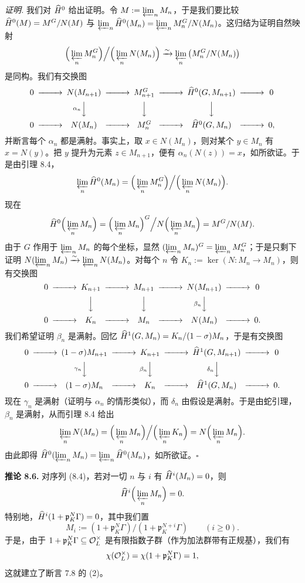 \textit{证明.} 我们对 $\widehat{H}^0$ 给出证明。令 $M:=\varprojlim_n M_n$，于是我们要比较 $\widehat{H}^0(M)=M^G/N(M)$ 与 $\varprojlim_n\widehat{H}^0(M_n)=\varprojlim_n M_n^G/N(M_n)$。这归结为证明自然映射
\[
\Big(\varprojlim_n M_n^G\Big)\Big/\Big(\varprojlim_n N(M_n)\Big)\xrightarrow{\sim}\varprojlim_n\big(M_n^G/N(M_n)\big)
\]
是同构。我们有交换图
\[
\begin{CD}
0 @>>> N(M_{n+1}) @>>> M_{n+1}^G @>>> \HH^0(G,M_{n+1}) @>>> 0\\
@. @V{\alpha_n}VV @VVV @VVV @.\\
0 @>>> N(M_{n}) @>>> M_{n}^G @>>> \HH^0(G,M_{n}) @>>> 0,
\end{CD}
\]
并断言每个 $\alpha_n$ 都是满射。事实上，取 $x\in N(M_n)$，则对某个 $y\in M_n$ 有 $x=N(y)$。把 $y$ 提升为元素 $z\in M_{n+1}$，便有 $\alpha_n(N(z))=x$，如所欲证。于是由引理 8.4，
\[
\varprojlim_n\widehat{H}^0(M_n)=\Big(\varprojlim_n M_n^G\Big)\Big/\Big(\varprojlim_n N(M_n)\Big).
\]
现在
\[
\widehat{H}^0\Big(\varprojlim_n M_n\Big)=\Big(\varprojlim_n M_n\Big)^G\Big/N\Big(\varprojlim_n M_n\Big)=M^G/N(M).
\]
由于 $G$ 作用于 $\varprojlim_n M_n$ 的每个坐标，显然 $(\varprojlim_n M_n)^G=\varprojlim_n M_n^G$；于是只剩下证明 $N(\varprojlim_n M_n)\xrightarrow{\sim}\varprojlim_n N(M_n)$。对每个 $n$ 令 $K_n:=\ker(N:M_n\to M_n)$，则有交换图
\[
\begin{CD}
0 @>>> K_{n+1} @>>> M_{n+1} @>>> N(M_{n+1}) @>>> 0\\
@. @VVV @VVV @V{\beta_n}VV @.\\
0 @>>> K_{n} @>>> M_{n} @>>> N(M_{n}) @>>> 0.
\end{CD}
\]
我们希望证明 $\beta_n$ 是满射。回忆 $\widehat{H}^1(G,M_n)=K_n/(1-\sigma)M_n$，于是有交换图
\[
\begin{CD}
0 @>>> (1-\sigma)M_{n+1} @>>> K_{n+1} @>>> \HH^1(G,M_{n+1}) @>>> 0\\
@. @V{\gamma_n}VV @V{\beta_n}VV @V{\delta_n}VV @.\\
0 @>>> (1-\sigma)M_{n} @>>> K_{n} @>>> \HH^1(G,M_{n}) @>>> 0.
\end{CD}
\]
现在 $\gamma_n$ 是满射（证明与 $\alpha_n$ 的情形类似），而 $\delta_n$ 由假设是满射。于是由蛇引理，$\beta_n$ 是满射，从而引理 8.4 给出
\[
\varprojlim_n N(M_n)=\Big(\varprojlim_n M_n\Big)\Big/\Big(\varprojlim_n K_n\Big)=N\Big(\varprojlim_n M_n\Big).
\]
由此即得 $\widehat{H}^0(\varprojlim_n M_n)=\varprojlim_n\widehat{H}^0(M_n)$，如所欲证。\hfill$\square$

\textbf{推论 8.6.} 对序列 (8.4)，若对一切 $n$ 与 $i$ 有 $\widehat{H}^i(M_n)=0$，则
\[
\widehat{H}^i\Big(\varprojlim_n M_n\Big)=0 .
\]
特别地，$\widehat{H}^i(1+\mathfrak p_K^N\Gamma)=0$，其中我们置
\[
M_i:=(1+\mathfrak p_K^N\Gamma)/(1+\mathfrak p_K^{N+i}\Gamma)\qquad(i\ge 0).
\]
于是，由于 $1+\mathfrak p_K^N\Gamma\subseteq\mathcal{O}_L^\times$ 是有限指数子群（作为加法群带有正规基），我们有
\[
\chi(\mathcal{O}_L^\times)=\chi(1+\mathfrak p_K^N\Gamma)=1,
\]
这就建立了断言 7.8 的 (2)。
